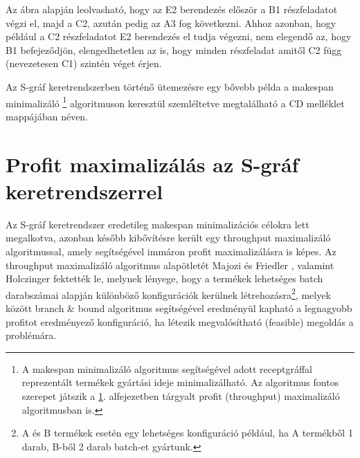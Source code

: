 Az ábra alapján leolvasható, hogy az E2 berendezés először a B1 részfeladatot végzi el, majd a C2, azután pedig az A3 fog következni.
Ahhoz azonban, hogy például a C2 részfeladatot E2 berendezés el tudja végezni, nem elegendő az, hogy B1 befejeződjön, elengedhetetlen az is, hogy minden részfeladat amitől C2 függ (nevezetesen C1) szintén véget érjen.

Az S-gráf keretrendszerben történő ütemezésre egy bővebb példa a makespan minimalizáló \footnote{A makespan minimalizáló algoritmus segítségével adott receptgráffal reprezentált termékek gyártási ideje minimalizálható. Az algoritmus fontos szerepet játszik a \ref{SgraphProfitMax}. alfejezetben tárgyalt profit (throughput) maximalizáló algoritmusban is.} algoritmuson keresztül szemléltetve megtalálható a CD melléklet  mappájában  néven. 
\section{Profit maximalizálás az S-gráf keretrendszerrel} \label{SgraphProfitMax}
Az S-gráf keretrendszer eredetileg makespan minimalizációs célokra lett megalkotva, azonban később kibővítésre került egy throughput maximalizáló algoritmussal, amely segítségével immáron profit maximalizálásra is képes.
Az throughput maximalizáló algoritmus alapötletét Majozi és Friedler \cite{doi:10.1021ie0604472}, valamint Holczinger \cite{HOLCZINGER2007649} fektették le, melynek lényege, hogy a termékek lehetséges batch darabszámai alapján különböző konfigurációk kerülnek létrehozásra\footnote{A és B termékek esetén egy lehetséges konfiguráció például, ha A termékből 1 darab, B-ből 2 darab batch-et gyártunk.}, melyek között branch \& bound algoritmus segítségével eredményül kapható a legnagyobb profitot eredményező konfiguráció, ha létezik megvalósítható (feasible) megoldás a problémára.

